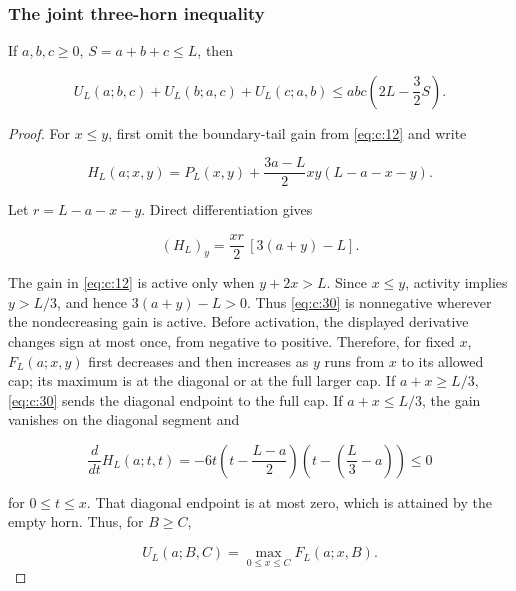 \subsubsection{The joint three-horn inequality}

\begin{lemma}\label{lemma:c:5.1}

If \(a,b,c\ge0\), \(S=a+b+c\le L\), then

\begin{equation}
\boxed{
U_L(a;b,c)+U_L(b;a,c)+U_L(c;a,b)
\le abc\left(2L-\frac32S\right).
}
\label{eq:c:28}
\end{equation}

\end{lemma}
\begin{proof}

For \(x\le y\), first omit the boundary-tail gain from \eqref{eq:c:12} and write

\begin{equation}
H_L(a;x,y)=P_L(x,y)
 +\frac{3a-L}{2}xy(L-a-x-y).
\label{eq:c:29}
\end{equation}

Let \(r=L-a-x-y\). Direct differentiation gives

\begin{equation}
(H_L)_y=\frac{xr}{2}\,[3(a+y)-L].
\label{eq:c:30}
\end{equation}

The gain in \eqref{eq:c:12} is active only when \(y+2x>L\). Since \(x\le y\),
activity implies \(y>L/3\), and hence \(3(a+y)-L>0\). Thus
\eqref{eq:c:30} is nonnegative wherever the nondecreasing gain is active.
Before activation, the displayed derivative changes sign at most once, from
negative to positive. Therefore, for fixed \(x\), \(F_L(a;x,y)\) first
decreases and then increases as \(y\) runs from \(x\) to its allowed cap;
its maximum is at the diagonal or at the full larger cap. If
\(a+x\ge L/3\), \eqref{eq:c:30} sends the diagonal endpoint to the full
cap. If \(a+x\le L/3\), the gain vanishes on the diagonal segment and

\begin{equation}
\frac d{dt}H_L(a;t,t)
=-6t\left(t-\frac{L-a}{2}\right)
       \left(t-\left(\frac L3-a\right)\right)\le0
\label{eq:c:31}
\end{equation}

for \(0\le t\le x\). That diagonal endpoint is at most zero, which is
attained by the empty horn. Thus, for \(B\ge C\),

\begin{equation}
U_L(a;B,C)=\max_{0\le x\le C}F_L(a;x,B).
\label{eq:c:32}
\end{equation}


\end{proof}
